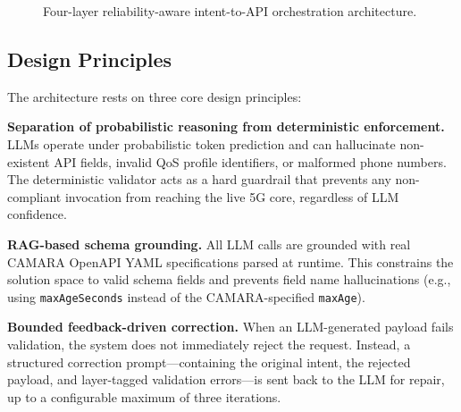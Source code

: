 \documentclass[conference]{IEEEtran}
\begin{document}
\begin{figure}[H]
\caption{Four-layer reliability-aware intent-to-API orchestration architecture.}
\label{fig:arch}
\end{figure}

\subsection{Design Principles}

The architecture rests on three core design principles:

\textbf{Separation of probabilistic reasoning from deterministic enforcement.}
LLMs operate under probabilistic token prediction and can hallucinate
non-existent API fields, invalid QoS profile identifiers, or malformed phone
numbers. The deterministic validator acts as a hard guardrail that prevents
any non-compliant invocation from reaching the live 5G core, regardless of
LLM confidence.

\textbf{RAG-based schema grounding.} All LLM calls are grounded with real
CAMARA OpenAPI YAML specifications parsed at runtime. This constrains the
solution space to valid schema fields and prevents field name hallucinations
(e.g., using \texttt{maxAgeSeconds} instead of the CAMARA-specified
\texttt{maxAge}).

\textbf{Bounded feedback-driven correction.} When an LLM-generated payload
fails validation, the system does not immediately reject the request. Instead,
a structured correction prompt—containing the original intent, the rejected
payload, and layer-tagged validation errors—is sent back to the LLM for repair,
up to a configurable maximum of three iterations.
\end{document}
